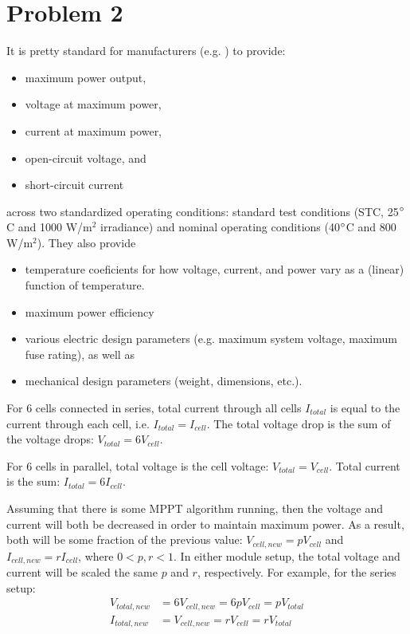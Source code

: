 \documentclass{homework}
\begin{document}
\section{Problem 2}
\begin{letterenum}
\item It is pretty standard for manufacturers
(e.g. \cite{noauthor_tiger_2020}\cite{noauthor_qpeak_2023}) to provide:
\begin{itemize}
    \item maximum power output,
    \item voltage at maximum power,
    \item current at maximum power,
    \item open-circuit voltage, and
    \item short-circuit current
\end{itemize}
across two standardized operating conditions: standard test conditions
(STC, 25$\degree$C and 1000 W/m$^2$ irradiance) and nominal operating conditions
(40$\degree$C and 800 W/m$^2$). They also provide
\begin{itemize}
    \item temperature coeficients for how voltage, current, and power vary
        as a (linear) function of temperature.
    \item maximum power efficiency
    \item various electric design parameters (e.g. maximum system voltage, maximum
        fuse rating), as well as
    \item mechanical design parameters (weight, dimensions, etc.).
\end{itemize}

\item For 6 cells connected in series, total current through all cells $I_{total}$ is equal
    to the current through each cell, i.e. $I_{total} = I_{cell}$. The total
    voltage drop is the sum of the voltage drops: $V_{total} = 6 V_{cell}$.
\item For 6 cells in parallel, total voltage is the cell voltage: $V_{total} = V_{cell}$.
    Total current is the sum: $I_{total} = 6 I_{cell}$.
\item Assuming that there is some MPPT algorithm running, then the voltage and current
    will both be decreased in order to maintain maximum power. As a result, both
    will be some fraction of the previous value: $V_{cell,new} = p V_{cell}$ and
    $I_{cell,new} = r I_{cell}$, where $0 < p,r < 1$. In either module setup, 
    the total voltage and current will be scaled the same $p$ and $r$, respectively.
    For example, for the series setup:
    \begin{align*}
        V_{total,new} &= 6 V_{cell,new} = 6 p V_{cell} = p V_{total} \\
        I_{total,new} &= V_{cell,new} = r V_{cell} = r V_{total} \\
    \end{align*}
\end{letterenum}
\end{document}
